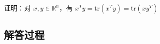 \begin{example}[迹与内积等价性]
    证明：对 \( x, y \in \mathbb{R}^n \)，有 \( x^T y = \text{tr}(x^T y) = \text{tr}(xy^T) \)
    \end{example}
    
    \subsection*{解答过程}
    